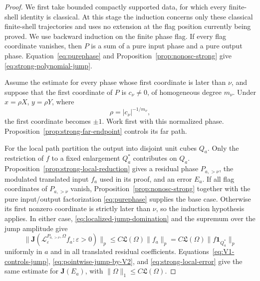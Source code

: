\documentclass[11pt]{article}
\numberwithin{equation}{section}
\theoremstyle{remark}
\theoremstyle{definition}
\newcommand{\cL}{\mathcal L}
\newcommand{\norm}[1]{\lVert #1\rVert}
\begin{document}
\begin{proof}
We first take bounded compactly supported data, for which every finite-shell
identity is classical.  At this stage the induction concerns only these
classical finite-shell trajectories and uses no extension at the flag
position currently being proved.  We use backward induction on the finite
phase flag.  If every flag coordinate vanishes, then \(P\) is a sum of a pure
input phase and a pure output phase.  Equation~\eqref{eq:purephase} and
Proposition~\ref{prop:nonosc-strong} give
\eqref{eq:strong-polynomial-jump}.

Assume the estimate for every phase whose first coordinate is later than
\(\nu\), and suppose that the first coordinate of \(P\) is
\(c_\nu\ne0\), of homogeneous degree \(m_\nu\).  Under
\(x=\rho X\), \(y=\rho Y\), where
\begin{equation}\label{eq:strong-normalizing-rho}
 \rho=|c_\nu|^{-1/m_\nu},
\end{equation}
the first coordinate becomes \(\pm1\).  Work first with this normalized
phase.  Proposition~\ref{prop:strong-far-endpoint} controls its far path.

For the local path partition the output into disjoint unit cubes \(Q_a\).
Only the restriction of \(f\) to a fixed enlargement \(Q_a^*\) contributes
on \(Q_a\).  Proposition~\ref{prop:strong-local-reduction} gives a
residual phase \(P_{a,>\nu}\), the modulated translated input $f_a$ used
in its proof, and an error \(E_a\).  If all flag coordinates of
$P_{a,>\nu}$ vanish, Proposition~\ref{prop:nonosc-strong} together with
the pure input/output factorization \eqref{eq:purephase} supplies the base
case.  Otherwise its first nonzero coordinate is strictly later than
$\nu$, so the induction hypothesis applies.  In either case,
\eqref{eq:localized-jump-domination} and the supremum over the jump
amplitude give
\begin{equation}\label{eq:strong-local-later-bound}
 \norm{\mathbf J(\cL^{P_{a,>\nu},\Omega}_\varepsilon
 f_a:\varepsilon>0)}_p
 \leq C\mathfrak L(\Omega)\norm{f_a}_p
 =C\mathfrak L(\Omega)\norm{f\mathbf1_{Q_a^*}}_p
\end{equation}
uniformly in \(a\) and in all translated residual coefficients.
Equations~\eqref{eq:V1-controls-jump},
\eqref{eq:pointwise-jump-by-V2}, and
\eqref{eq:strong-local-error} give the same estimate for
$\mathbf J(E_a)$, with
\(\norm\Omega_1\leq C\mathfrak L(\Omega)\).


\end{proof}
\end{document}
